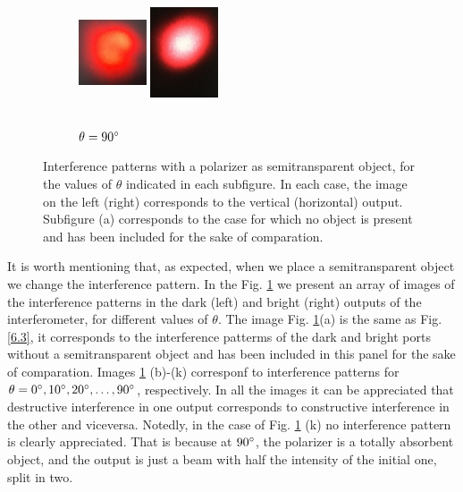 \documentclass[12pt]{book}
\begin{document}
\begin{figure}[H]
\begin{subfigure}[b]{0.3\linewidth}
\centering
\includegraphics[width=2cm,height=3.5cm]{images/fotos/111.jpg}
\includegraphics[width=2cm,height=3.5cm]{images/fotos/12.jpg}
\caption{$\theta=90\degree$}
\end{subfigure}

\caption{ Interference patterns with a polarizer as semitransparent object, for the values of $\theta$ indicated in each subfigure. In each case, the image on the left (right) corresponds to the vertical (horizontal) output. Subfigure (a) corresponds to the case for which no object is present and has been included for the sake of comparation.}
\label{intensities2222}
\end{figure}

\pagebreak

It is worth mentioning that, as expected, when we place a  semitransparent object we change the interference pattern. In the Fig. \ref{intensities2222} we present an array of images of the interference patterns in the dark (left) and bright (right) outputs of the interferometer, for different values of $\theta$. The image Fig. \ref{intensities2222}(a) is the same as Fig. \ref{6.3}, it corresponds to the interference patterms of the dark and bright ports without a semitransparent object and has been included in this panel for the sake of comparation. Images \ref{intensities2222} (b)-(k) corresponf to interference patterns for $\theta=0\degree,10\degree,20\degree,\dots,90\degree$, respectively. In all the images it can be appreciated that destructive interference in one output corresponds to constructive interference in the other and viceversa. Notedly, in the case of Fig. \ref{intensities2222} (k) no interference pattern is clearly appreciated. That is because at $90\degree$, the polarizer is a totally absorbent object,  and the output is just a beam with half the intensity of the initial one, split in two.
\end{document}
